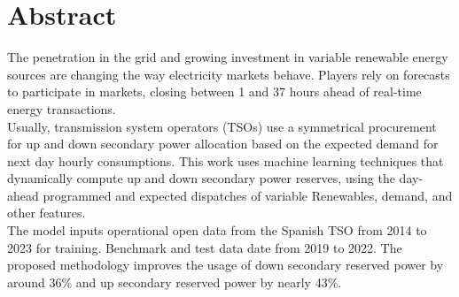 \chapter{Abstract}
The penetration in the grid and growing investment in variable renewable energy sources are changing the way electricity markets behave. Players rely on forecasts to participate in markets, closing between 1 and 37 hours ahead of real-time energy transactions. \\
Usually, transmission system operators (TSOs) use a symmetrical procurement for up and down secondary power allocation based on the expected demand for next day hourly consumptions. This work uses machine learning techniques that dynamically compute up and down secondary power reserves, using the day-ahead programmed and expected dispatches of variable Renewables, demand, and other  features.\\
The model inputs operational open data from the Spanish TSO from 2014 to 2023 for training. Benchmark and test data date from 2019 to 2022. The proposed methodology improves the usage of down secondary reserved power by around 36\% and up secondary reserved power by nearly 43\%.\\



\vspace{0.5cm} %

